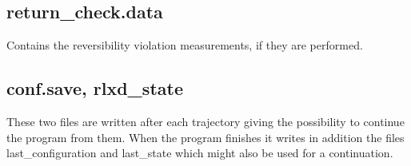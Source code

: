\subsection*{\ttfamily return\_check.data}
Contains the reversibility violation measurements, if they are
performed. 

\subsection*{\ttfamily conf.save, rlxd\_state}
These two files are written after each trajectory giving the
possibility to continue the program from them. When the program
finishes it writes in addition the files {\ttfamily
  last\_configuration} and {\ttfamily last\_state} which might also be
used for a continuation.

